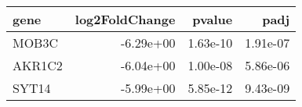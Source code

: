 \begin{tabular}{lrrr}
\toprule
  gene &  log2FoldChange &   pvalue &     padj \\
\midrule
 MOB3C &       -6.29e+00 & 1.63e-10 & 1.91e-07 \\
AKR1C2 &       -6.04e+00 & 1.00e-08 & 5.86e-06 \\
 SYT14 &       -5.99e+00 & 5.85e-12 & 9.43e-09 \\
\bottomrule
\end{tabular}
